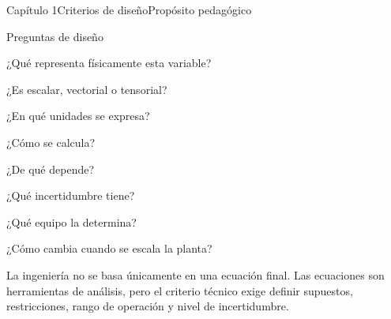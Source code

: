 \begin{HVTPage}{Capítulo 1}{Criterios de diseño}{Propósito pedagógico}
\begin{HVTTaskOrdered}{Preguntas de diseño}\item ¿Qué representa físicamente esta variable? \item ¿Es escalar, vectorial o tensorial? \item ¿En qué unidades se expresa? \item ¿Cómo se calcula? \item ¿De qué depende? \item ¿Qué incertidumbre tiene? \item ¿Qué equipo la determina? \item ¿Cómo cambia cuando se escala la planta? \end{HVTTaskOrdered}
\begin{HVTWarning}{La ingeniería no se basa únicamente en una ecuación final. Las ecuaciones son herramientas de análisis, pero el criterio técnico exige definir supuestos, restricciones, rango de operación y nivel de incertidumbre.} \end{HVTWarning}
\end{HVTPage}

